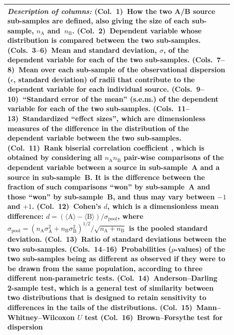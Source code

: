 \begin{table}
  \begin{tabular}{p{0.9\linewidth}}
    \toprule
    \textit{Description of columns:}
    (Col.~1)~How the two A/B source sub-samples are defined, also giving the size of each sub-sample, \(n_{\text{A}}\) and~\(n_{\text{B}}\).
    (Col.~2)~Dependent variable whose distribution is compared between the two sub-samples.
    (Cols.~3--6)~Mean and standard deviation, \(\sigma\), of the dependent variable for each of the two sub-samples.
    (Cols.~7--8)~Mean over each sub-sample of the observational dispersion (\(\epsilon\), standard deviation) of radii that contribute to the dependent variable for each individual source.
    (Cols.~9--10)~``Standard error of the mean'' (s.e.m.) of the dependent variable for each of the two sub-samples. 
    (Cols.~11--13)~Standardized ``effect sizes'', which are dimensionless measures of the difference in the distribution of the dependent variable between the two sub-samples.
    (Col.~11)~Rank biserial correlation coefficient \citep{Cureton:1956a}, which is obtained by considering all \(n_{\text{A}} n_{\text{B}}\) pair-wise comparisons of the dependent variable between a source in sub-sample~A and a source in sub-sample~B.  It is the difference between the fraction of such comparisons ``won'' by sub-sample~A and those ``won'' by sub-sample~B, and thus may vary between \(-1\) and \(+1\). 
    (Col.~12)~Cohen's \(d\), which is a dimensionless mean difference: \(d = (\langle \text{A} \rangle - \langle \text{B} \rangle) / \sigma_{\text{pool}} \), where \(\sigma_{\text{pool}} = (n_{\text{A}} \sigma_{\text{A}}^2 + n_{\text{B}} \sigma_{\text{B}}^2)^{1/2} / \sqrt{n_{\text{A}} + n_{\text{B}}}\) is the pooled standard deviation.
    (Col.~13)~Ratio of standard deviations between the two sub-samples.
    (Cols.~14--16)~Probabilities (\(p\)-values) of the two sub-samples being as different as observed if they were to be drawn from the same population, according to three different non-parametric tests.
    (Col.~14)~Anderson--Darling 2-sample test, which is a general test of similarity between two distributions that is designed to retain sensitivity to differences in the tails of the distributions.
    (Col.~15)~Mann--Whitney--Wilcoxon \(U\) test \citep{Mann:1947a}
    (Col.~16)~Brown--Forsythe test for dispersion
    \\
    \bottomrule
  \end{tabular}
\end{table}

